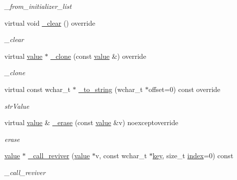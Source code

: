 \begin{DoxyCompactItemize}
\begin{DoxyCompactList}\small\item\em \+\_\+from\+\_\+initializer\+\_\+list \end{DoxyCompactList}\item 
virtual void \hyperlink{classformat_1_1json_add5e23fba3d384156bc3eadc1207c6ac}{\+\_\+clear} () override\hypertarget{classformat_1_1json_add5e23fba3d384156bc3eadc1207c6ac}{}\label{classformat_1_1json_add5e23fba3d384156bc3eadc1207c6ac}

\begin{DoxyCompactList}\small\item\em \+\_\+clear \end{DoxyCompactList}\item 
virtual \hyperlink{classformat_1_1value_aa6b85823936bf7b8ab78d3f8d443c00d}{value} $\ast$ \hyperlink{classformat_1_1json_a4da6b9a624017973c5955d840e61fdb7}{\+\_\+clone} (const \hyperlink{classformat_1_1value_aa6b85823936bf7b8ab78d3f8d443c00d}{value} \&) override
\begin{DoxyCompactList}\small\item\em \+\_\+clone \end{DoxyCompactList}\item 
virtual const wchar\+\_\+t $\ast$ \hyperlink{classformat_1_1json_afbb5d88bc2005d89b287e05d89fb2e06}{\+\_\+to\+\_\+string} (wchar\+\_\+t $\ast$offset=0) const override
\begin{DoxyCompactList}\small\item\em str\+Value \end{DoxyCompactList}\item 
virtual \hyperlink{classformat_1_1value_aa6b85823936bf7b8ab78d3f8d443c00d}{value} \& \hyperlink{classformat_1_1json_adfc8837bee40c5a11809717f8d34b192}{\+\_\+erase} (const \hyperlink{classformat_1_1value_aa6b85823936bf7b8ab78d3f8d443c00d}{value} \&v) noexceptoverride
\begin{DoxyCompactList}\small\item\em erase \end{DoxyCompactList}\item 
\hyperlink{classformat_1_1value_aa6b85823936bf7b8ab78d3f8d443c00d}{value} $\ast$ \hyperlink{classformat_1_1json_af4314003df90a7cf9e4da35b57946296}{\+\_\+call\+\_\+reviver} (\hyperlink{classformat_1_1value_aa6b85823936bf7b8ab78d3f8d443c00d}{value} $\ast$v, const wchar\+\_\+t $\ast$\hyperlink{classformat_1_1value_ad4865e7984fc9f3b5ce7c17fd7ac740c}{key}, size\+\_\+t \hyperlink{classformat_1_1value_aaa429b28cc0edf5a3589b89a1820ad62}{index}=0) const 
\begin{DoxyCompactList}\small\item\em \+\_\+call\+\_\+reviver \end{DoxyCompactList}\end{DoxyCompactItemize}

